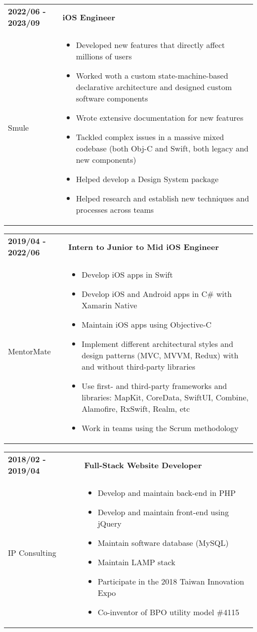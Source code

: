 \documentclass[11pt,a4paper]{article}
\newcommand{\workblock}[4]{
    \begin{tabular}{p{0.25\columnwidth}p{0.65\columnwidth}}
        \textbf{#1} & \textbf{#2} \\
        #3 & #4 \\
    \end{tabular}
}
\begin{document}
    \workblock{2022/06 - 2023/09}{iOS Engineer}
    {Smule}{
        \begin{itemize}
            \item Developed new features that directly affect millions of users
            \item Worked woth a custom state-machine-based declarative architecture and designed custom software components
            \item Wrote extensive documentation for new features
            \item Tackled complex issues in a massive mixed codebase (both Obj-C and Swift, both legacy and new components)
            \item Helped develop a Design System package
            \item Helped research and establish new techniques and processes across teams
        \end{itemize}
    }

    \workblock{2019/04 - 2022/06}{Intern to Junior to Mid iOS Engineer}
    {MentorMate}{
        \begin{itemize}
            \item Develop iOS apps in Swift
            \item Develop iOS and Android apps in C\# with Xamarin Native
            \item Maintain iOS apps using Objective-C
            \item Implement different architectural styles and design patterns (MVC, MVVM, Redux) with and without third-party libraries
            \item Use first- and third-party frameworks and libraries: MapKit, CoreData, SwiftUI, Combine, Alamofire, RxSwift, Realm, etc
            \item Work in teams using the Scrum methodology
        \end{itemize}
    }

    \workblock{2018/02 - 2019/04}{Full-Stack Website Developer}
    {IP Consulting}{
        \begin{itemize}
            \item Develop and maintain back-end in PHP
            \item Develop and maintain front-end using jQuery
            \item Maintain software database (MySQL)
            \item Maintain LAMP stack
            \item Participate in the 2018 Taiwan Innovation Expo
            \item Co-inventor of BPO utility model \#4115
        \end{itemize}
    }
    
\end{document}
